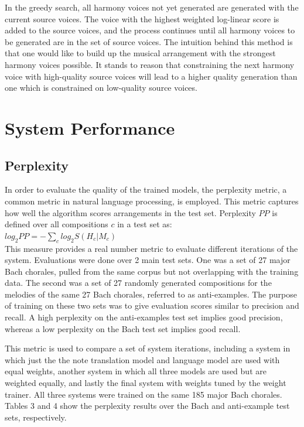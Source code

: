 \documentclass{sig-alternate}
\begin{document}
In the greedy search, all harmony voices not yet generated are generated with the current source voices. The voice with the highest weighted log-linear score is added to the source voices, and the process continues until all harmony voices to be generated are in the set of source voices. The intuition behind this method is that one would like to build up the musical arrangement with the strongest harmony voices possible.
It stands to reason that constraining the next harmony voice with high-quality source voices will lead to a higher quality generation than one which is constrained on low-quality source voices.

\section{System Performance}
\label{sec:sys_perform}
\subsection{Perplexity}
In order to evaluate the quality of the trained models, the perplexity metric, a common metric in natural language processing, is employed. This metric captures how well the algorithm scores arrangements in the test set. Perplexity $PP$ \cite{Koehn:2010:SMT:1734086} is defined over all compositions $c$ in a test set as:\\

$log_2 PP = - \sum_{c} log_2 S(H_{c} | M_{c})$\\

This measure provides a real number metric to evaluate different iterations of the system. Evaluations were done over 2 main test sets. One was a set of 27 major Bach chorales, pulled from the same corpus but not overlapping with the training data. The second was a set of 27 randomly generated compositions for the melodies of the same 27 Bach chorales, referred to as anti-examples. The purpose of training on these two sets was to give evaluation scores similar to precision and recall. A high perplexity on the anti-examples test set implies good precision, whereas a low perplexity on the Bach test set implies good recall. 	

This metric is used to compare a set of system iterations, including a system in which just the the note translation model and language model are used with equal weights, another system in which all three models are used but are weighted equally, and lastly the final system with weights tuned by the weight trainer. All three systems were trained on the same 185 major Bach chorales. Tables 3 and 4 show the perplexity results over the Bach and anti-example test sets, respectively. 
\end{document}
